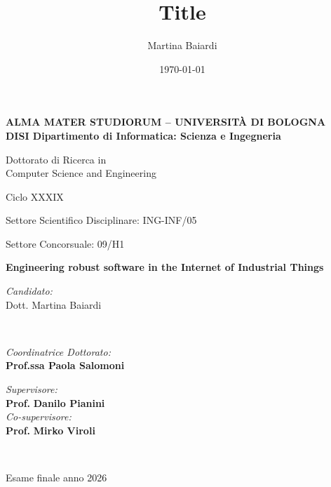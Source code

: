 \title{Title}
\author{Martina Baiardi}
\date{\today}

\begin{titlepage}
	\begin{center}

		\large
		\textbf{ALMA MATER STUDIORUM -- UNIVERSITÀ DI BOLOGNA \\ DISI Dipartimento di Informatica: Scienza e Ingegneria}
		\\
		\noindent\hrulefill
		\vspace{0.4cm}

		\Large
		Dottorato di Ricerca in \\
		Computer Science and Engineering

		\vspace{0.4cm}

		Ciclo XXXIX

		\vspace{0.4cm}

		Settore Scientifico Disciplinare: ING-INF/05

		Settore Concorsuale: 09/H1

		\Huge
		\vspace{3cm}
		\textbf{
			Engineering robust software in the
			Internet of Industrial Things
		}

		{\Large{
		\vspace{3cm}

		\textit{Candidato:\\}
		\centering
		Dott. Martina Baiardi}
		\\}
		\large
		\vspace{2.5cm}
		\begin{minipage}[t]{0.64\textwidth}
			\begin{flushleft}
				\textit{Coordinatrice Dottorato:}
				\\
				\textbf{Prof.ssa Paola Salomoni}
			\end{flushleft}
		\end{minipage}
		\begin{minipage}[t]{0.34\textwidth}
			\begin{flushright}
				\textit{Supervisore:}
				\\
				\textbf{Prof.} \textbf{Danilo Pianini}
				\\
				\vspace{0.4cm}
				\textit{Co-supervisore:}
				\\
				\textbf{Prof.} \textbf{Mirko Viroli}
			\end{flushright}

		\end{minipage}\\

		\vfill
		\noindent\hrulefill
		\vspace{0.3cm}
		\Large

		Esame finale anno 2026
	\end{center}
\end{titlepage}
\restoregeometry